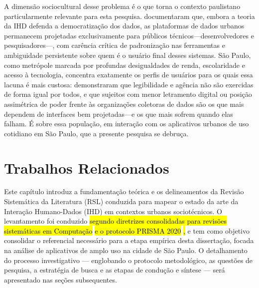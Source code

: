 \documentclass[
	12pt,				%
	oneside,			%
	a4paper,			%
	english,			%
	brazil				%
	]{abntex2ppgsi}
\newcommand{\hlciteonline}[1]{\colorbox{yellow}{\citeonline{#1}}} %
\begin{document}
    A dimensão sociocultural desse problema é o que torna o contexto paulistano particularmente relevante para esta pesquisa.  documentaram que, embora a teoria da IHD defenda a democratização dos dados, as plataformas de dados urbanos permanecem projetadas exclusivamente para públicos técnicos---desenvolvedores e pesquisadores---, com carência crítica de padronização nas ferramentas e ambiguidade persistente sobre quem é o usuário final desses sistemas. São Paulo, como metrópole marcada por profundas desigualdades de renda, escolaridade e acesso à tecnologia, concentra exatamente os perfis de usuários para os quais essa lacuna é mais custosa:  demonstraram que legibilidade e agência não são exercidas de forma igual por todos, e que sujeitos com menor letramento digital ou posição assimétrica de poder frente às organizações coletoras de dados são os que mais dependem de interfaces bem projetadas---e os que mais sofrem quando elas falham. É sobre essa população, em interação com os aplicativos urbanos de uso cotidiano em São Paulo, que a presente pesquisa se debruça.





\chapter{Trabalhos Relacionados}

    Este capítulo introduz a fundamentação teórica e os delineamentos da Revisão Sistemática da Literatura (RSL) conduzida para mapear o estado da arte da Interação Humano-Dados (IHD) em contextos urbanos sociotécnicos. O levantamento foi conduzido \hl{segundo diretrizes consolidadas para revisões sistemáticas em Computação}  \hl{e o protocolo PRISMA 2020} \hlciteonline{prisma2021}\hl{,} e tem como objetivo consolidar o referencial necessário para a etapa empírica desta dissertação, focada na análise de aplicativos de amplo uso na cidade de São Paulo. O detalhamento do processo investigativo — englobando o protocolo metodológico, as questões de pesquisa, a estratégia de busca e as etapas de condução e síntese — será apresentado nas seções subsequentes.
\end{document}
